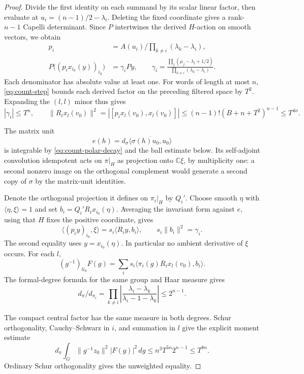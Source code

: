 \begin{proof}
Divide the first identity on each summand by its scalar linear
factor, then evaluate at \(u_i=(n-1)/2-\lambda_i\). Deleting the
fixed coordinate gives a rank-\(n-1\) Capelli determinant. Since
\(P\) intertwines the derived \(H\)-action on smooth vectors, we obtain
\begin{align*}
 p_i&=A(u_i)\Big/\prod_{k\ne i}(\lambda_k-\lambda_i),\\
 P\big((p_i x_{i_0}(y))_{i_0}\big)&=\gamma_i Py,\qquad
 \gamma_i=\frac{\prod_j(\mu_j-\lambda_i+1/2)}
                      {\prod_{k\ne i}(\lambda_k-\lambda_i)} .
\end{align*}
Each denominator has absolute value at least one. For words of
length at most \(n\), \eqref{eq:count-step} bounds each derived
factor on the preceding filtered space by \(T^2\). Expanding the
\((l,l)\) minor thus gives
\[
 |\gamma_i|\le T^n,\qquad
 \|R_i x_l(v_0)\|^2
  =|[p_i x_l(v_0),x_l(v_0)]|
  \le(n-1)!(B+n+T^2)^{n-1}\le T^{4n}.
\]

The matrix unit
\[ e(h)=d_\sigma\overline{\langle\sigma(h)u_0,u_0\rangle} \]
is integrable by \eqref{eq:count-polar-decay} and the ball estimate
below. Its self-adjoint convolution idempotent acts on \(\pi|_H\)
as projection onto \(\mathbb C\xi\), by multiplicity one: a second
nonzero image on the orthogonal complement would generate a second
copy of \(\sigma\) by the matrix-unit identities.

Denote the
orthogonal projection it defines on \(\pi_i|_H\) by \(Q_i'\).
Choose smooth \(\eta\) with \(\langle\eta,\xi\rangle=1\) and set
\(b_i=Q_i'R_i x_{i_0}(\eta)\). Averaging the invariant form against
\(e\), using that \(H\) fixes the positive coordinate, gives
\[
 \langle(p_i y)_{i_0},\xi\rangle
    =s_i\langle R_i y,b_i\rangle,\qquad
 s_i\|b_i\|^2=\gamma_i .
\]
The second equality uses \(y=x_{i_0}(\eta)\). In particular no
ambient derivative of \(\xi\) occurs. For each \(l\),
\[
  (g^{-1})_{li_0} F(g)
   =\sum_i s_i\langle\pi_i(g)R_i x_l(v_0),b_i\rangle .
\]
The formal-degree formula for the same group and Haar measure gives
\[
 d_\pi/d_{\pi_i}
  =\prod_{k\ne i}\left|\frac{\lambda_i-\lambda_k}
                                  {\lambda_i-1-\lambda_k}\right|
  \le2^{n-1}.
\]

The compact central factor has the same measure in both degrees.
\cite[Theorem~8.1 and (3.10), (3.12)]{atiyah-schmid}
Schur orthogonality, Cauchy--Schwarz in \(i\), and summation in \(l\)
give the explicit moment estimate
\[
 d_\pi\int_G\|g^{-1}z_0\|^2|F(g)|^2\,dg
          \le n^3T^{5n}2^{n-1}\le T^{8n}.
\]
Ordinary Schur orthogonality gives the unweighted equality.


\end{proof}
